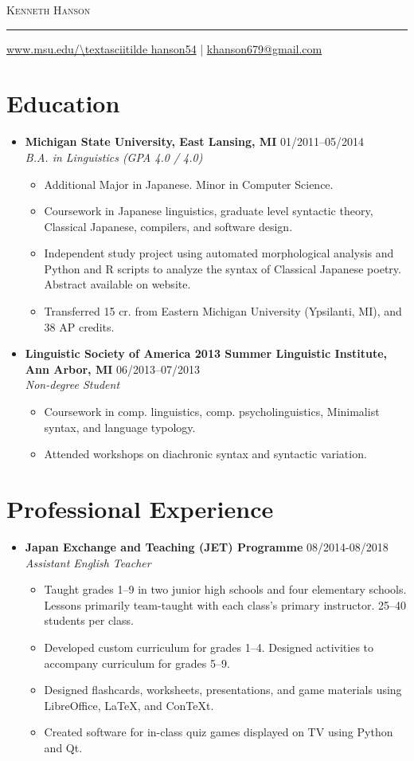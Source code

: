 \documentclass[10pt,oneside]{article}
\makeatletter
\newcommand{\name}{Kenneth Hanson}
\newcommand{\email}{khanson679@gmail.com}
\newcommand{\website}{www.msu.edu/\textasciitilde hanson54}
\newcommand{\bigname}{%
	{\centering\scshape\Huge \name \par}
}
\newcommand{\contactinfo}{%
	{\raggedleft\small \url{\website} | \href{mailto:\email}{\email} \par}
}
\newcommand{\topheading}{%
	\bigname
	\rule{\textwidth}{1pt} \par
	\contactinfo
}
\newcommand{\ressection}[1]{
	\vspace{-12pt}
	\section*{#1}
}
\newcommand{\resbigitem}[4]{
	\item
	\textbf{#1} \hfill #2 \\
	\textit{#3} \hfill \textit{#4}
}
\makeatother
\begin{document}
\topheading

\ressection{Education}

\begin{itemize}
	\resbigitem{Michigan State University, East Lansing, MI}
		{01/2011--05/2014}
		{B.A. in Linguistics (GPA 4.0 / 4.0)}
		{}
	\begin{itemize}
		\item{Additional Major in Japanese. Minor in Computer Science.}
		\item{Coursework in Japanese linguistics, graduate level syntactic theory, Classical Japanese, compilers, and software design.}
		\item{Independent study project using automated morphological analysis and Python and R scripts to analyze the syntax of Classical Japanese poetry. Abstract available on website.}
		\item{Transferred 15 cr. from Eastern Michigan University (Ypsilanti, MI), and 38 AP credits.}
	\end{itemize}
	
	\resbigitem{Linguistic Society of America 2013 Summer Linguistic Institute, Ann Arbor, MI}
		{06/2013--07/2013}
		{Non-degree Student}
		{}
	\begin{itemize}
		\item{Coursework in comp. linguistics, comp. psycholinguistics, Minimalist syntax, and language typology.}
		\item{Attended workshops on diachronic syntax and syntactic variation.}
	\end{itemize}
\end{itemize}


\ressection{Professional Experience}

\begin{itemize}
	\resbigitem{Japan Exchange and Teaching (JET) Programme}
	{08/2014-08/2018}
	{Assistant English Teacher}
	{}
	\begin{itemize}
		\item Taught grades 1--9 in two junior high schools and four elementary schools. Lessons primarily team-taught with each class's primary instructor. 25--40 students per class.
		\item Developed custom curriculum for grades 1--4. Designed activities to accompany curriculum for grades 5--9.
		\item Designed flashcards, worksheets, presentations, and game materials using LibreOffice, LaTeX, and ConTeXt.
		\item Created software for in-class quiz games displayed on TV using Python and Qt.
	\end{itemize}
\end{itemize}
\end{document}
